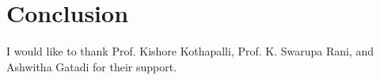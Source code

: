 \documentclass[sigconf,nonacm]{acmart}
\begin{document}
\section{Conclusion}
\label{sec:conclusion}


\begin{acks}
I would like to thank Prof. Kishore Kothapalli, Prof. K. Swarupa Rani, and Ashwitha Gatadi for their support.
\end{acks}




\clearpage
\appendix

\end{document}
